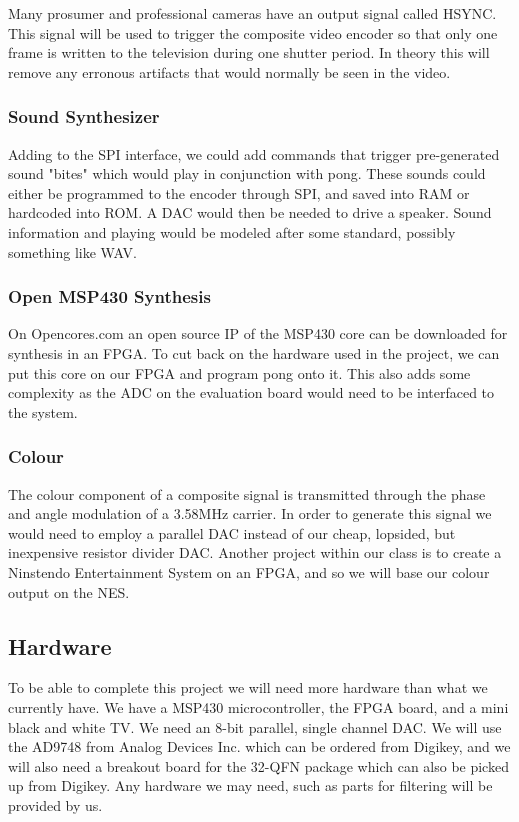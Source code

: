 Many prosumer and professional cameras have an output signal called HSYNC. This
signal will be used to trigger the composite video encoder so that only one
frame is written to the television during one shutter period. In theory this
will remove any erronous artifacts that would normally be seen in the video.

\subsubsection{Sound Synthesizer}

Adding to the SPI interface, we could add commands that trigger pre-generated
sound "bites" which would play in conjunction with pong. These sounds could
either be programmed to the encoder through SPI, and saved into RAM or hardcoded
into ROM. A DAC would then be needed to drive a speaker. Sound information and
playing would be modeled after some standard, possibly something like WAV.

\subsubsection{Open MSP430 Synthesis}

On Opencores.com an open source IP of the MSP430 core can be downloaded for
synthesis in an FPGA. To cut back on the hardware used in the project, we can
put this core on our FPGA and program pong onto it. This also adds some
complexity as the ADC on the evaluation board would need to be interfaced to the
system.

\subsubsection{Colour}

The colour component of a composite signal is transmitted through the phase and
angle modulation of a 3.58MHz carrier. In order to generate this signal we would
need to employ a parallel DAC instead of our cheap, lopsided, but inexpensive
resistor divider DAC. Another project within our class is to create a Ninstendo
Entertainment System on an FPGA, and so we will base our colour output on the
NES.


\subsection{Hardware}

To be able to complete this project we will need more hardware than what we 
currently have. We have a MSP430 microcontroller, the FPGA board, and a mini
black and white TV. We need an 8-bit parallel, single channel DAC. We will use
the AD9748 from Analog Devices Inc. which can be ordered from Digikey, and we
will also need a breakout board for the 32-QFN package which can also be picked
up from Digikey. Any hardware we may need, such as parts for filtering will be
provided by us.

